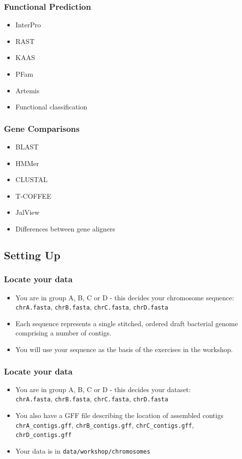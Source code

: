 \documentclass[table]{beamer}
\begin{document}
    \begin{frame}
     \frametitle{Functional Prediction}
     \begin{itemize}
       \item InterPro
       \item RAST
       \item KAAS
       \item PFam
       \item Artemis
       \item Functional classification
     \end{itemize}
    \end{frame}
    
    \begin{frame}
     \frametitle{Gene Comparisons}
     \begin{itemize}
       \item BLAST
       \item HMMer
       \item CLUSTAL
       \item T-COFFEE
       \item JalView
       \item Differences between gene aligners
     \end{itemize}
    \end{frame}


\subsection{Setting Up}
  \begin{frame}
    \frametitle{Locate your data}
    \begin{itemize}
      \item You are in group A, B, C or D - this decides your chromosome sequence: \\
      \texttt{chrA.fasta}, \texttt{chrB.fasta}, \texttt{chrC.fasta}, \texttt{chrD.fasta}
      \item Each sequence represents a single stitched, ordered draft bacterial genome comprising a number of contigs.
      \item You will use your sequence as the basis of the exercises in the workshop.
    \end{itemize}
  \end{frame}  
  
  \begin{frame}
    \frametitle{Locate your data}
    \begin{itemize}
      \item You are in group A, B, C or D - this decides your dataset: \\
      \texttt{chrA.fasta}, \texttt{chrB.fasta}, \texttt{chrC.fasta}, \texttt{chrD.fasta}
      \item You also have a GFF file describing the location of assembled contigs \\
      \texttt{chrA\_contigs.gff}, \texttt{chrB\_contigs.gff}, \texttt{chrC\_contigs.gff}, \texttt{chrD\_contigs.gff}
      \item Your data is in \texttt{data/workshop/chromosomes}
    \end{itemize}
  \end{frame}    
  
\end{document}
